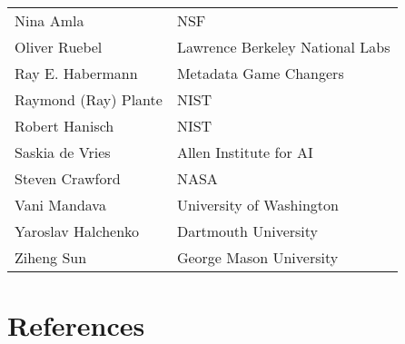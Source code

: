 \documentclass[
  letterpaper,
  DIV=11,
  numbers=noendperiod]{scrartcl}
\begin{document}
\begin{longtable}[]{@{}ll@{}}
Nina Amla & NSF \\
Oliver Ruebel & Lawrence Berkeley National Labs \\
Ray E. Habermann & Metadata Game Changers \\
Raymond (Ray) Plante & NIST \\
Robert Hanisch & NIST \\
Saskia de Vries & Allen Institute for AI \\
Steven Crawford & NASA \\
Vani Mandava & University of Washington \\
Yaroslav Halchenko & Dartmouth University \\
Ziheng Sun & George Mason University \\
\end{longtable}

\section*{References}\label{references}
\end{document}
